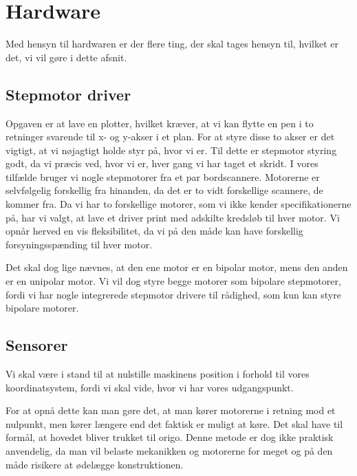 \chapter[Design af hardware]{Hardware}
\label{ch:d-hardware}


Med hensyn til hardwaren er der flere ting, der skal tages hensyn
til, hvilket er det, vi vil gøre i dette afsnit.

\section{Stepmotor driver}
Opgaven er at lave en plotter, hvilket kræver, at vi kan flytte en pen
i to retninger svarende til x- og y-akser i et plan.
For at styre disse to akser er det vigtigt, at vi
nøjagtigt holde styr på, hvor vi er. Til dette er stepmotor styring
godt, da vi præcis ved, hvor vi er, hver gang vi har taget et skridt. I
vores tilfælde bruger vi nogle stepmotorer fra et par
bordscannere. Motorerne er selvfølgelig
forskellig fra hinanden, da det er to vidt forskellige scannere, de kommer fra. Da vi har to
forskellige motorer, som vi ikke kender specifikationerne på, har vi
valgt, at lave et driver print med adskilte kredsløb til hver
motor. Vi opnår herved en vis fleksibilitet, da vi på den måde kan
have forskellig forsyningsspænding til hver motor.

Det skal dog lige nævnes, at den ene motor er en bipolar motor, mens
den anden er en unipolar motor. Vi vil dog styre begge motorer som
bipolare stepmotorer, fordi vi har nogle integrerede stepmotor
drivere til rådighed, som kun kan styre bipolare motorer.

\section{Sensorer}
Vi skal være i stand til at nulstille maskinens position i forhold til
vores koordinatsystem, fordi vi skal vide, hvor vi har vores
udgangspunkt.

For at opnå dette kan man gøre det, at man kører motorerne i retning
mod et nulpunkt, men kører længere end det faktisk er muligt at
køre. Det skal have til formål, at hovedet bliver trukket til
origo. Denne metode er dog ikke praktisk anvendelig, da man vil belaste
mekanikken og motorerne for meget og på den måde risikere at ødelægge
konstruktionen.

